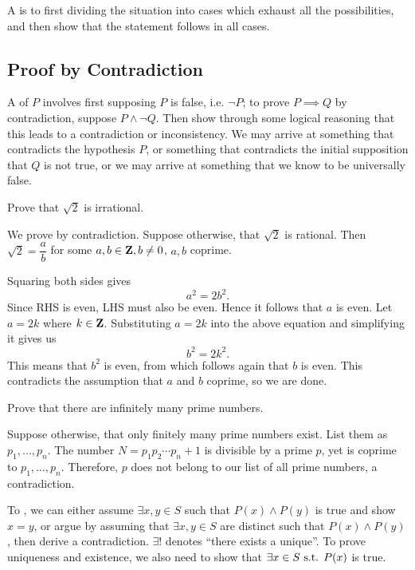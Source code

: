 A  is to first dividing the situation into cases which exhaust all the possibilities, and then show that the statement follows in all cases.

\subsection{Proof by Contradiction}
A  of $P$ involves first supposing $P$ is false, i.e. $\lnot P$; to prove $P \implies Q$ by contradiction, suppose $P\land\lnot Q$. Then show through some logical reasoning that this leads to a contradiction or inconsistency. We may arrive at something that contradicts the hypothesis $P$, or something that contradicts the initial supposition that $Q$ is not true, or we may arrive at something that we know to be universally false.

\begin{exercise}
Prove that $\sqrt{2}$ is irrational.
\end{exercise}
\begin{solution}
We prove by contradiction. Suppose otherwise, that $\sqrt{2}$ is rational. Then $\sqrt{2}=\dfrac{a}{b}$ for some $a,b\in\mathbf Z,b\neq 0$, $a,b$ coprime.

Squaring both sides gives
\[a^2=2b^2.\]
Since RHS is even, LHS must also be even. Hence it follows that $a$ is even. Let $a=2k$ where $k\in\mathbf Z$. Substituting $a = 2k$ into the above equation and simplifying it gives us
\[b^2=2k^2.\]
This means that $b^2$ is even, from which follows again that $b$ is even. This contradicts the assumption that $a$ and $b$ coprime, so we are done.
\end{solution}

\begin{exercise}[Euclid]
Prove that there are infinitely many prime numbers.
\end{exercise}

\begin{solution}
Suppose otherwise, that only finitely many prime numbers exist. List them as $p_1,\dots,p_n$. The number $N=p_1p_2\cdots p_n+1$ is divisible by a prime $p$, yet is coprime to $p_1,\dots,p_n$. Therefore, $p$ does not belong to our list of all prime numbers, a contradiction.
\end{solution}

To , we can either assume $\exists x,y \in S$ such that $P(x) \land P(y)$ is true and show $x=y$, or argue by assuming that $\exists x,y \in S$ are distinct such that $P(x) \land P(y)$, then derive a contradiction. $\exists!$ denotes ``there exists a unique''. To prove uniqueness and existence, we also need to show that $\exists x \in S \text{ s.t. } P(x)$ is true.

